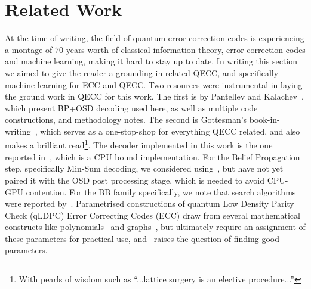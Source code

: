 \section{Related Work}\label{sec:related-work}
At the time of writing, the field of quantum error correction 
codes is experiencing a montage of \(70\) years worth of classical information theory, 
error correction codes and machine learning, making it hard to stay up to date.
In writing this section we aimed to give the reader a grounding in related QECC,
and specifically machine learning for ECC and QECC. 
Two resources were instrumental in laying the ground work in QECC for this work. 
The first is by Pantellev and Kalachev~\cite{panteleev2021degenerate}, 
which present BP+OSD decoding used here, as well as multiple code constructions, and methodology notes.
The second is Gottesman's book-in-writing~\cite{gottesman2026surviving}, 
which serves as a one-stop-shop for everything QECC related, 
and also makes a brilliant read\footnote{With pearls of wisdom such as ``...lattice surgery is an elective procedure...''}. 
The decoder implemented in this work is the one reported in~\cite{roffe_decoding_2020}, 
which is a CPU bound implementation. 
For the Belief Propagation step, specifically Min-Sum decoding, 
we considered using~\cite{sella2025mapping}, but have not yet paired it with the 
OSD post processing stage, which is needed to avoid CPU-GPU contention. 
For the BB family specifically, we note that search algorithms were reported by~\cite{wang2026coprime, wang2024coprime}.
\noindent Parametrised constructions of quantum Low Density Parity Check (qLDPC) Error Correcting Codes (ECC) 
draw from several mathematical constructs like polynomials~\cite{panteleev2021degenerate}
and graphs~\cite{evra2022decodable, manjunath2026universal}, 
but ultimately require an assignment of these parameters for practical use, 
and~\cite{panteleev2021degenerate} raises the question of finding good parameters. 

